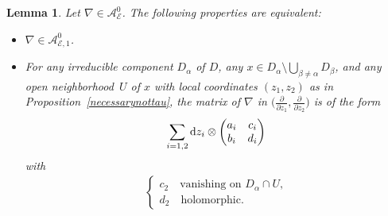 \documentclass[pdftex]{sigma}
\newcommand{\der}[2]{\frac{\partial #1}{\partial#2}}
\numberwithin{equation}{section}
\newtheorem{Lemma}[Theorem]{Lemma}
\begin{document}
\begin{Lemma}\label{caracterisationintermediate} Let $\nabla \in \mathcal{A}^0_\mathcal{E}$. The following properties are equivalent:
 \begin{itemize}\itemsep=0pt
 \item[$(i)$] $\nabla \in \mathcal{A}^0_{\mathcal{E},1}$.
 \item[$(ii)$] For any irreducible component $D_\alpha$ of $D$, any $x\in D_\alpha \setminus \bigcup_{\beta \neq \alpha} D_\beta$, and any open neighborhood~$U$ of $x$ with local coordinates $(z_1,z_2)$ as in Proposition~{\rm \ref{necessarynottau}}, the matrix of $\nabla$ in $\big(\der{}{z_1},\der{}{z_2}\big)$ is of the form
 \[\sum_{i=1,2}{\rm d}z_i \otimes \begin{pmatrix} a_i & c_i \\ b_i & d_i \end{pmatrix} \]
 with
 \begin{align*}%
 \begin{cases} c_2 \quad\text{vanishing on $D_\alpha\cap U$,} \\ d_2 \quad \text{holomorphic.} \end{cases}\end{align*}
 \end{itemize}

\end{Lemma}
\end{document}
